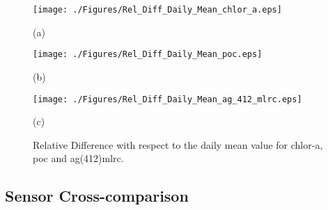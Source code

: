 \documentclass[onecolumn,3p,letterpaper,11pt]{elsarticle}
\begin{document}
\begin{figure}[htb!]
    \begin{minipage}[c]{0.33\linewidth}
      \centering
      \texttt{[image: ./Figures/Rel\_Diff\_Daily\_Mean\_chlor\_a.eps]}
    \centerline{(a)}\medskip
    \end{minipage}  
    \begin{minipage}[c]{0.33\linewidth}
      \centering
      \texttt{[image: ./Figures/Rel\_Diff\_Daily\_Mean\_poc.eps]}
      \centerline{(b)}\medskip
    \end{minipage}  
  	\begin{minipage}[c]{0.33\linewidth}
      \centering
      \texttt{[image: ./Figures/Rel\_Diff\_Daily\_Mean\_ag\_412\_mlrc.eps]}
    \centerline{(c)}\medskip
    \end{minipage}  

    \caption{Relative Difference with respect to the daily mean value for chlor-a, poc and ag(412)mlrc. \label{fig:DiffDailyMeanProd} } 
\end{figure}

\subsection{Sensor Cross-comparison}
\end{document}
